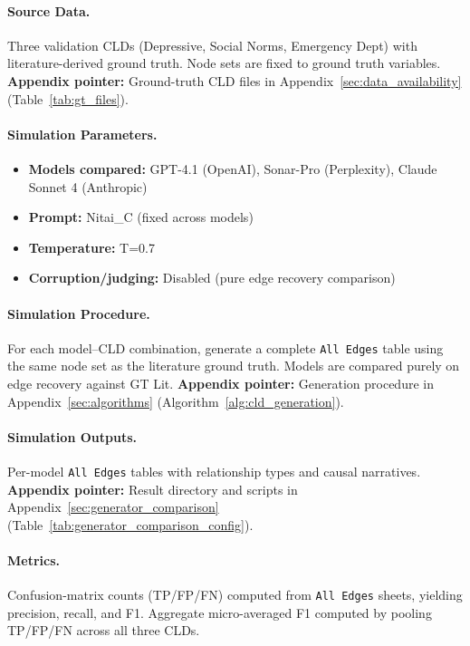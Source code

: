 \paragraph{Source Data.}
Three validation CLDs (Depressive, Social Norms, Emergency Dept) with literature-derived ground truth. Node sets are fixed to ground truth variables.
\textbf{Appendix pointer:} Ground-truth CLD files in Appendix~\ref{sec:data_availability} (Table~\ref{tab:gt_files}).

\paragraph{Simulation Parameters.}
\begin{itemize}[noitemsep]
    \item \textbf{Models compared:} GPT-4.1 (OpenAI), Sonar-Pro (Perplexity), Claude Sonnet 4 (Anthropic)
    \item \textbf{Prompt:} Nitai\_C (fixed across models)
    \item \textbf{Temperature:} T=0.7
    \item \textbf{Corruption/judging:} Disabled (pure edge recovery comparison)
\end{itemize}

\paragraph{Simulation Procedure.}
For each model--CLD combination, generate a complete \texttt{All Edges} table using the same node set as the literature ground truth. Models are compared purely on edge recovery against GT Lit.
\textbf{Appendix pointer:} Generation procedure in Appendix~\ref{sec:algorithms} (Algorithm~\ref{alg:cld_generation}).

\paragraph{Simulation Outputs.}
Per-model \texttt{All Edges} tables with relationship types and causal narratives.
\textbf{Appendix pointer:} Result directory and scripts in Appendix~\ref{sec:generator_comparison} (Table~\ref{tab:generator_comparison_config}).

\paragraph{Metrics.}
Confusion-matrix counts (TP/FP/FN) computed from \texttt{All Edges} sheets, yielding precision, recall, and F1. Aggregate micro-averaged F1 computed by pooling TP/FP/FN across all three CLDs.

